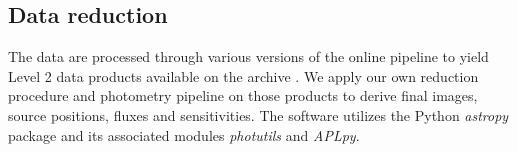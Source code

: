 



\subsection{Data reduction}
The data are processed through various versions of the online pipeline to yield Level 2 data products available on the archive \citep{Herter:2013by}. We apply our own reduction procedure and photometry pipeline on those products to derive final images, source positions, fluxes and sensitivities. The software utilizes the Python \textit{astropy} package \citep{2013A&A...558A..33A} and its associated modules \textit{photutils} and \textit{APLpy}. 

